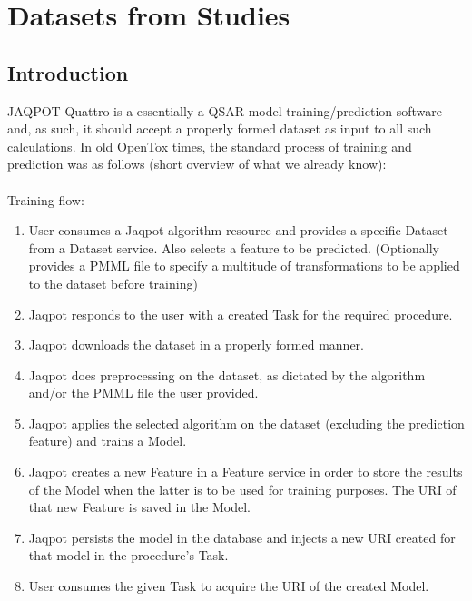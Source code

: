 \chapter{Datasets from Studies}

\section{Introduction}
JAQPOT Quattro is a essentially a QSAR model training/prediction software and, 
as such, it should accept a properly formed dataset as input to all 
such calculations. In old OpenTox times, the standard process of training 
and prediction was as follows (short overview of what we already know):\\\\

\noindent Training flow:
\begin{enumerate}
 \item 	User consumes a Jaqpot algorithm resource and provides a 
	specific Dataset from a Dataset service. Also selects a feature to be 
	predicted. (Optionally provides a PMML file to specify a multitude of 
	transformations to be applied to the dataset before training)
\item  Jaqpot responds to the user with a created Task for the required procedure.
\item   Jaqpot downloads the dataset in a properly formed manner.
 \item  Jaqpot does preprocessing on the dataset, as dictated by the algorithm and/or the PMML file the user provided.
 \item  Jaqpot applies the selected algorithm on the dataset (excluding the prediction feature) and trains a Model. 
 \item  Jaqpot creates a new Feature in a Feature service in order to store the results of the Model when the latter is to be used for training purposes. The URI of that new Feature is saved in the Model.
 \item  Jaqpot persists the model in the database and injects a new URI created for that model in the procedure’s Task.
 \item  User consumes the given Task to acquire the URI of the created Model.
\end{enumerate}

 
 
